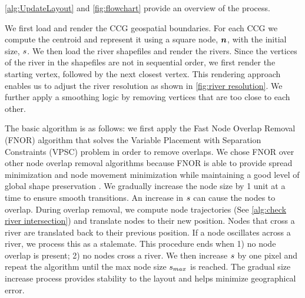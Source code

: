 \autoref{alg:UpdateLayout} and \autoref{fig:flowchart} provide an overview of the process.

 We first load and render the CCG geospatial boundaries. For each CCG we compute the centroid and represent it using a square node, $ \bm{n} $, with the initial size, $ s $. We then load the river shapefiles and render the rivers. Since the vertices of the river in the shapefiles are not in sequential order, we first render the starting vertex, followed by the next closest vertex. This rendering approach enables us to adjust the river resolution as shown in \autoref{fig:river resolution}. We further apply a smoothing logic by removing vertices that are too close to each other.

 The basic algorithm is as follows: we first apply the Fast Node Overlap Removal (FNOR) algorithm that solves the Variable Placement with Separation Constraints (VPSC) problem \cite{dwyer2006fast} in order to remove overlaps. We chose FNOR over other node overlap removal algorithms because FNOR is able to provide spread minimization and node movement minimization while maintaining a good level of global shape preservation \cite{chen2020Node}. We gradually increase the node size by 1 unit at a time to ensure smooth transitions. An increase in $ s $ can cause the nodes to overlap. During overlap removal, we compute node trajectories (See \autoref{alg:check river intersection}) and translate nodes to their new position. Nodes that cross a river are translated back to their previous position. If a node oscillates across a river, we process this as a stalemate. This procedure ends when 1) no node overlap is present; 2) no nodes cross a river. We then increase $ s $ by one pixel and repeat the algorithm until the max node size $ s_{max} $ is reached. The gradual size increase process provides stability to the layout and helps minimize geographical error.



